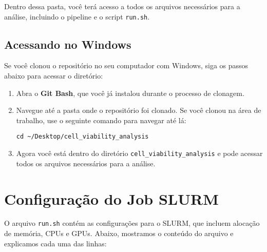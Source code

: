\documentclass[a4paper, 12pt]{article}
\begin{document}
Dentro dessa pasta, você terá acesso a todos os arquivos necessários para a análise, incluindo o pipeline e o script \texttt{run.sh}.

\subsection{Acessando no Windows}

Se você clonou o repositório no seu computador com Windows, siga os passos abaixo para acessar o diretório:

\begin{enumerate}
    \item Abra o \textbf{Git Bash}, que você já instalou durante o processo de clonagem.

    \item Navegue até a pasta onde o repositório foi clonado. Se você clonou na área de trabalho, use o seguinte comando para navegar até lá:

\begin{verbatim}
cd ~/Desktop/cell_viability_analysis
\end{verbatim}

    \item Agora você está dentro do diretório \texttt{cell\_viability\_analysis} e pode acessar todos os arquivos necessários para a análise.
\end{enumerate}

\section{Configuração do Job SLURM}

O arquivo \texttt{run.sh} contém as configurações para o SLURM, que incluem alocação de memória, CPUs e GPUs. Abaixo, mostramos o conteúdo do arquivo e explicamos cada uma das linhas:
\end{document}
